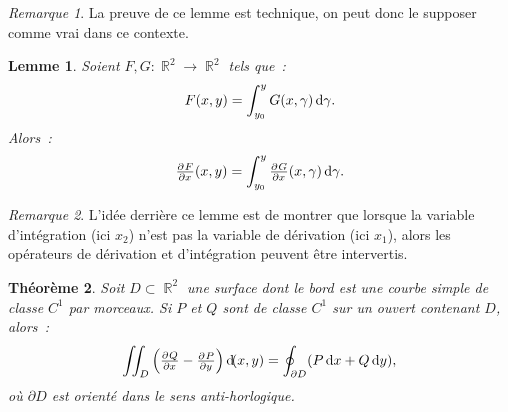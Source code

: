 \documentclass{article}
\DeclareMathOperator{\R}{\mathbb R}
\newtheorem{thm}{Théorème}[section]
\newtheorem{lem}[thm]{Lemme}
\theoremstyle{definition}
\theoremstyle{remark}
\newtheorem*{rmq}{Remarque}
\begin{document}
		\begin{rmq} La preuve de ce lemme est technique, on peut donc le supposer comme vrai dans ce contexte. \end{rmq}

		\begin{lem}\label{lem:opdérivationintégration} Soient $F, G : \R^2 \to \R^2$ tels que~:
		\[F(x, y) = \int_{y_0}^yG(x, \gamma)\dif \gamma.\]
		Alors~:
		\[\pd Fx(x, y) = \int_{y_0}^y\pd Gx(x, \gamma)\dif \gamma.\]
		\end{lem}

		\begin{rmq} L'idée derrière ce lemme est de montrer que lorsque la variable d'intégration (ici $x_2$) n'est pas la variable de dérivation (ici $x_1$),
		alors les opérateurs de dérivation et d'intégration peuvent être intervertis.
		\end{rmq}

		\begin{thm}\label{thm:CGR} Soit $D \subset \R^2$ une surface dont le bord est une courbe simple de classe $C^1$ par morceaux. Si $P$ et $Q$ sont de
		classe $C^1$ sur un ouvert contenant $D$, alors~:
		\[\iint_D\left(\pd Qx - \pd Py\right)\dif (x, y) = \oint_{\partial D}(P\dif x + Q\dif y),\]
		où $\partial D$ est orienté dans le sens anti-horlogique.
		\end{thm}
\end{document}
